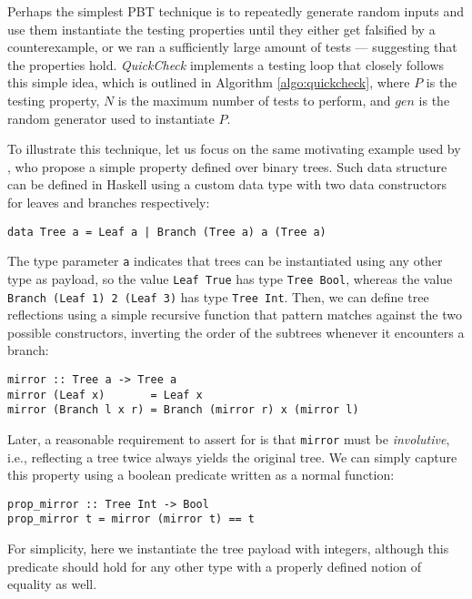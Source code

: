 \documentclass[sigconf, anonymous]{acmart}
\newcommand{\quickcheck}{\textit{QuickCheck}\xspace}
\begin{document}
Perhaps the simplest PBT technique is to repeatedly generate random inputs and
use them instantiate the testing properties until they either get falsified by a
counterexample, or we ran a sufficiently large amount of tests --- suggesting
that the properties hold.
%
\quickcheck implements a testing loop that closely follows this simple idea,
which is outlined in Algorithm \ref{algo:quickcheck}, where $P$ is the testing
property, $N$ is the maximum number of tests to perform, and $gen$ is the random
generator used to instantiate $P$.



To illustrate this technique, let us focus on the same motivating example used
by \citeauthor{lampropoulos2019coverage}, who propose a simple property defined over
binary trees.
%
Such data structure can be defined in Haskell using a custom data type with two
data constructors for leaves and branches respectively:

\begin{verbatim}
data Tree a = Leaf a | Branch (Tree a) a (Tree a)
\end{verbatim}

\noindent The type parameter \texttt{a} indicates that trees can be instantiated
using any other type as payload, so the value \texttt{Leaf True} has type
\texttt{Tree Bool}, whereas the value \texttt{Branch (Leaf 1) 2 (Leaf 3)} has
type \texttt{Tree Int}.
%
Then, we can define tree reflections using a simple recursive function that
pattern matches against the two possible constructors, inverting the order of
the subtrees whenever it encounters a branch:

\begin{verbatim}
mirror :: Tree a -> Tree a
mirror (Leaf x)       = Leaf x
mirror (Branch l x r) = Branch (mirror r) x (mirror l)
\end{verbatim}

Later, a reasonable requirement to assert for is that \texttt{mirror} must be
\emph{involutive}, i.e., reflecting a tree twice always yields the original
tree.
%
We can simply capture this property using a boolean predicate written as a
normal function:

\begin{verbatim}
prop_mirror :: Tree Int -> Bool
prop_mirror t = mirror (mirror t) == t
\end{verbatim}

\noindent For simplicity, here we instantiate the tree payload with integers,
although this predicate should hold for any other type with a properly defined
notion of equality as well.
\end{document}
